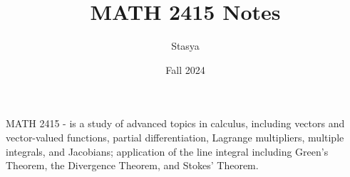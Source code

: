 \documentclass[10pt,a4paper,oneside]{book}
\title{MATH 2415 Notes}
\author{Stasya}
\date{Fall 2024}
\begin{document}
\maketitle
\bigbreak
\begin{center}
    MATH 2415 - is a study of advanced topics in calculus, including vectors and vector-valued functions, partial differentiation, 
    Lagrange multipliers, multiple integrals, and Jacobians; application of the line integral including Green's Theorem, the 
    Divergence Theorem, and Stokes' Theorem.
\end{center}
\bigbreak
\tableofcontents





\end{document}
